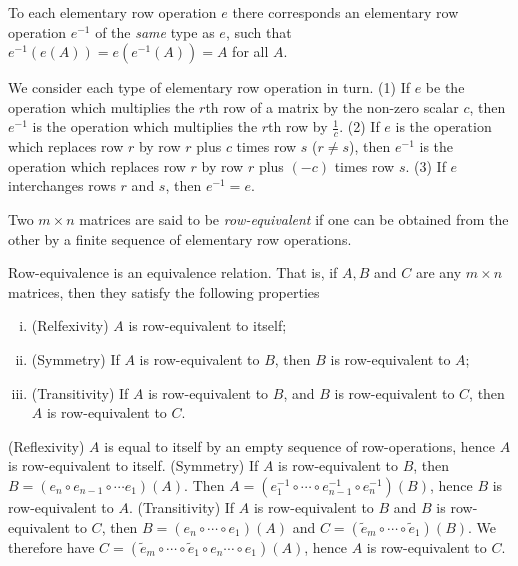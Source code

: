 \documentclass[12pt,letterpaper,reqno]{article}
\numberwithin{equation}{section}
\newcommand{\ti}[1]{\textit{#1}}
\begin{document}
\begin{thm}\label{thm:elementary_row_operations_are_invertible}
	To each elementary row operation $e$ there corresponds an elementary row operation $e^{-1}$ of the \emph{same} type as $e$, such that $e^{-1}(e(A))=e(e^{-1}(A))=A$ for all $A$.
\end{thm}

\begin{pf} We consider each type of elementary row operation in turn.
	(1) If $e$ be the operation which multiplies the $r$th row of a matrix by the non-zero scalar $c$, then $e^{-1}$ is the operation which multiplies the $r$th row by $\frac{1}{c}$. (2) If $e$ is the operation which replaces row $r$ by row $r$ plus $c$ times row $s$ ($r \neq s$), then $e^{-1}$ is the operation which replaces row $r$ by row $r$ plus $(-c)$ times row $s$. (3) If $e$ interchanges rows $r$ and $s$, then $e^{-1}=e$. 
\end{pf}

\begin{defn}\label{def:row_equivalent_matrices}
	Two $m \times n$ matrices are said to be \ti{row-equivalent} if one can be obtained from the other by a finite sequence of elementary row operations. 
\end{defn}

\begin{lem}\label{lem:row_equivalence_is_an_equivalence_relation}
Row-equivalence is an equivalence relation. That is, if $A,B$ and $C$ are any $m \times n$ matrices, then they satisfy the following properties
\begin{enumerate}[(i)]
	\item (Relfexivity) $A$ is row-equivalent to itself;
	\item (Symmetry) If $A$ is row-equivalent to $B$, then $B$ is row-equivalent to $A$;
	\item (Transitivity) If $A$ is row-equivalent to $B$, and $B$ is row-equivalent to $C$, then $A$ is row-equivalent to $C$.
\end{enumerate}
\end{lem}
\begin{pf}
	(Reflexivity) $A$ is equal to itself by an empty sequence of row-operations, hence $A$ is row-equivalent to itself. (Symmetry) If $A$ is row-equivalent to $B$, then $B=(e_n \circ e_{n-1} \circ \cdots e_1)(A)$. Then $A=(e_1^{-1}\circ \cdots \circ e_{n-1}^{-1} \circ e_n^{-1})(B)$, hence $B$ is row-equivalent to $A$. (Transitivity) If $A$ is row-equivalent to $B$ and $B$ is row-equivalent to $C$, then $B=(e_n \circ \cdots \circ e_1)(A)$ and $C=(\tilde{e}_m \circ \cdots \circ \tilde{e}_1)(B)$. We therefore have $C=(\tilde{e}_m \circ \cdots \circ \tilde{e}_1\circ e_n \cdots \circ e_1)(A)$, hence $A$ is row-equivalent to $C$.
\end{pf}
\end{document}
